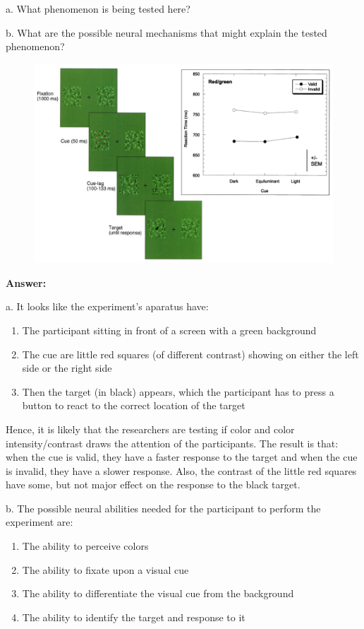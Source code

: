 \documentclass[letterpaper, 11pt]{article}
\begin{document}
a. What phenomenon is being tested here?

b. What are the possible neural mechanisms that might explain the tested phenomenon?

\begin{figure}[htb!]
	\centering
	\includegraphics[width=0.7\linewidth]{fig2.png}
	\label{fig2}
\end{figure}

\textbf{Answer:}

a. It looks like the experiment's aparatus have:

\begin{enumerate}
	\item The participant sitting in front of a screen with a green background
	\item The cue are little red squares (of different contrast) showing on either the left side or the right side
	\item Then the target (in black) appears, which the participant has to press a button to react to the correct location of the target
\end{enumerate}

Hence, it is likely that the researchers are testing if color and color intensity/contrast draws the attention of the participants. The result is that: when the cue is valid, they have a faster response to the target and when the cue is invalid, they have a slower response. Also, the contrast of the little red squares have some, but not major effect on the response to the black target.

b. The possible neural abilities needed for the participant to perform the experiment are:

\begin{enumerate}
	\item The ability to perceive colors
	\item The ability to fixate upon a visual cue
	\item The ability to differentiate the visual cue from the background
	\item The ability to identify the target and response to it
\end{enumerate}
\end{document}
